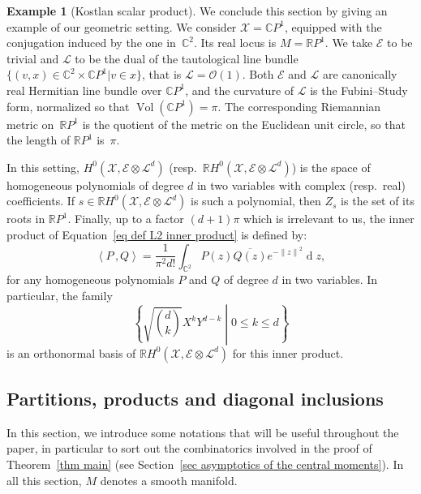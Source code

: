 \documentclass[10pt]{amsart}
\theoremstyle{definition}\newtheorem{defi}[theo]{Definition}\newtheorem{rema}[theo]{Remark}\newtheorem{exam}[theo]{Example}\newtheorem{exem}[theo]{Example}\newtheorem{nota}[theo]{Notation}
\DeclareMathOperator{\dmesure}{d}
\DeclareMathOperator{\Vol}{Vol}
\newcommand{\E}{\mathcal{E}}
\newcommand{\X}{\mathcal{X}}
\renewcommand{\L}{\mathcal{L}}
\newcommand{\clO}{\mathcal{O}}
\newcommand{\C}{\mathbb{C}}
\newcommand{\R}{\mathbb{R}}
\newcommand{\dx}{\dmesure\!}
\newcommand{\mvert}{\mathrel{}\middle|\mathrel{}}
\newcommand{\Norm}[1]{\left\lVert #1 \right\rVert}
\newcommand{\prsc}[2]{\left\langle #1\,, #2 \right\rangle}
\newcommand{\vol}[1]{\Vol\!\left(#1\right)}
\renewcommand{\H}{H^0(\X,\E \otimes \L^d)}
\renewcommand{\bar}{\overline}
\renewcommand{\leq}{\leqslant}
\begin{document}
\begin{exam}[{Kostlan scalar product}]\label{ex Kostlan inner product}
We conclude this section by giving an example of our geometric setting. We consider $\X =\C P^1$, equipped with the conjugation induced by the one in~$\C^2$. Its real locus is $M=\R P^1$. We take $\E$ to be trivial and $\L$ to be the dual of the tautological line bundle $\{(v,x) \in \C^2 \times \C P^1 \vert v \in x \}$, that is $\L = \clO(1)$. Both $\E$ and $\L$ are canonically real Hermitian line bundle over $\C P^1$, and the curvature of $\L$ is the Fubini--Study form, normalized so that $\vol{\C P^1}=\pi$. The corresponding Riemannian metric on~$\R P^1$ is the quotient of the metric on the Euclidean unit circle, so that the length of $\R P^1$ is~$\pi$.

In this setting, $\H$ (resp.~$\R\H$) is the space of homogeneous polynomials of degree $d$ in two variables with complex (resp.~real) coefficients. If $s \in \R\H$ is such a polynomial, then $Z_s$ is the set of its roots in $\R P^1$. Finally, up to a factor $(d+1)\pi$ which is irrelevant to us, the inner product of Equation~\eqref{eq def L2 inner product} is defined by:
\[
\prsc{P}{Q} = \frac{1}{\pi^2d!} \int_{\C^2} P(z) \bar{Q(z)} e^{-\Norm{z}^2} \dx z,
\]
for any homogeneous polynomials $P$ and $Q$ of degree $d$ in two variables. In particular, the family
\[
\left\{\sqrt{\binom{d}{k}}X^kY^{d-k} \mvert 0\leq k\leq d\right\}
\]
 is an orthonormal basis of $\R\H$ for this inner product.
\end{exam}



\subsection{Partitions, products and diagonal inclusions}\label{subsec partitions products and diagonal inclusions}

In this section, we introduce some notations that will be useful throughout the paper, in particular to sort out the combinatorics involved in the proof of Theorem~\ref{thm main} (see Section~\ref{sec asymptotics of the central moments}). In all this section, $M$ denotes a smooth manifold.
\end{document}
